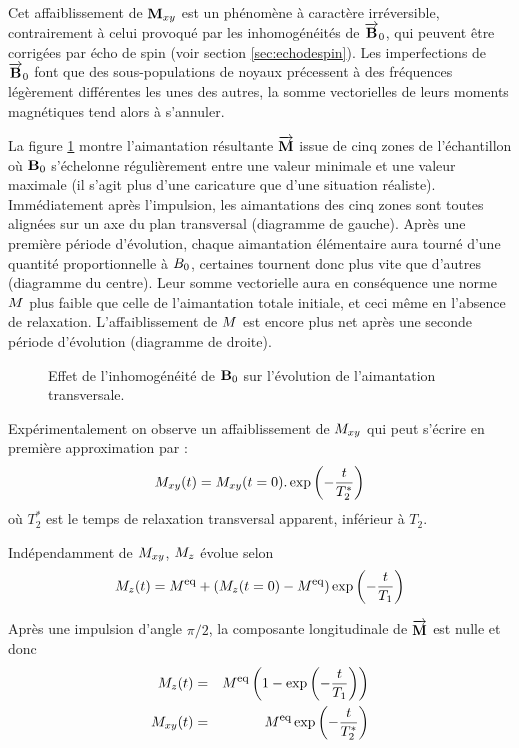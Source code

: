 Cet affaiblissement de $\mathbf{M}_{xy}$ est un phénomène à caractère irréversible,
contrairement à celui provoqué par les inhomogénéités de $\overrightarrow{\mathbf{B}}_0$,
qui peuvent être corrigées par écho de spin (voir section \ref{sec:echodespin}).
Les imperfections de $\overrightarrow{\mathbf{B}}_0$ font que des sous-populations de noyaux précessent à des
fréquences légèrement différentes les unes des autres, la somme vectorielles de leurs
moments magnétiques tend alors à s'annuler.

La figure \ref{fig:isochrom} montre l'aimantation résultante $\overrightarrow{\mathbf{M}}$ issue de cinq zones
de l'échantillon où $\mathbf{B}_0$ s'échelonne régulièrement entre une valeur minimale
et une valeur maximale (il s'agit plus d'une caricature que d'une situation réaliste).
Immédiatement après l'impulsion, les aimantations des cinq zones sont toutes alignées
sur un axe du plan transversal (diagramme de gauche).
Après une première période d'évolution, chaque aimantation élémentaire aura
tourné d'une quantité proportionnelle à $B_0$, certaines tournent
donc plus vite que d'autres (diagramme du centre).
Leur somme vectorielle aura en conséquence une norme $M$ plus faible que 
celle de l'aimantation totale initiale, et ceci même en l'absence de relaxation.
L'affaiblissement de $M$ est encore plus net après une seconde
période d'évolution (diagramme de droite).

\begin{figure}[hbt]
\begin{center}
\end{center}
\caption{Effet de l'inhomogénéité de $\mathbf{B}_0$ sur l'évolution de l'aimantation transversale.}
\label{fig:isochrom}
\end{figure}

Expérimentalement on observe un affaiblissement de $M_{xy}$ qui peut s'écrire
en première approximation par :
\begin{equation}
M_{xy} (t) = M_{xy} (t=0) . \exp \left( -\frac{t}{T_2^*} \right)
\end{equation}
où $T_2^*$ est le temps de relaxation transversal apparent, inférieur à $T_2$.

Indépendamment de $M_{xy}$, $M_z$ évolue selon
\begin{equation}
M_z(t) = M^{\mbox{\footnotesize{eq}}} + (M_z (t=0) - M^{\mbox{\footnotesize{eq}}})\exp \left( -\frac{t}{T_1} \right)
\end{equation}

Après une impulsion d'angle $\pi/2$, la composante longitudinale de $\overrightarrow{\mathbf{M}}$
est nulle et donc
\begin{eqnarray}
\label{eqn:relaxlong}
M_z(t) & = & M^{\mbox{\footnotesize{eq}}} \left( 1 - \exp \left( -\frac{t}{T_1} \right) \right) \\
\label{eqn:relaxtrans}
M_{xy}(t) & = & M^{\mbox{\footnotesize{eq}}} \exp \left( -\frac{t}{T_2^*} \right)
\end{eqnarray}

